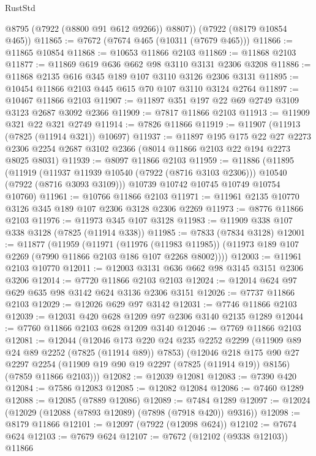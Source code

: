 \begin{lexlean}{RustStd}
\begin{coremodule}
        @8795
        (@7922 (@8800 @91 @612 @9266))
        @8807))
    (@7922 (@8179 @10854 @465))
@11865 := @7672 (@7674 @465 (@10311 (@7679 @465)))
@11866 := @11865 @10854
@11868 := @10653 @11866 @2103
@11869 := @11868 @2103
@11877 := @11869 @619 @636 @662 @98 @3110 @3131 @2306 @3208
@11886 := @11868 @2135 @616 @345 @189 @107 @3110 @3126 @2306 @3131
@11895 := @10454 @11866 @2103 @445 @615 @70 @107 @3110 @3124 @2764
@11897 := @10467 @11866 @2103
@11907 := @11897 @351 @197 @22 @69 @2749 @3109 @3123 @2687 @3092 @2366
@11909 := @7817 @11866 @2103
@11913 := @11909 @321 @22 @321 @2749
@11914 := @7826 @11866
@11919 := @11907 (@11913 (@7825 (@11914 @321)) @10697)
@11937 := @11897
    @195
    @175
    @22
    @27
    @2273
    @2306
    @2254
    @2687
    @3102
    @2366
    (@8014 @11866 @2103 @22 @194 @2273 @8025 @8031)
@11939 := @8097 @11866 @2103
@11959 := @11886
    (@11895
      (@11919 (@11937 @11939 @10540 (@7922 (@8716 @3103 @2306))) @10540 (@7922 (@8716 @3093 @3109)))
      @10739
      @10742
      @10745
      @10749
      @10754
      @10760)
@11961 := @10766 @11866 @2103
@11971 := @11961 @2135 @10770 @3126 @345 @189 @107 @2306 @3128 @2306 @2269
@11973 := @8776 @11866 @2103
@11976 := @11973 @345 @107 @3128
@11983 := @11909 @338 @107 @338 @3128 (@7825 (@11914 @338))
@11985 := @7833 (@7834 @3128)
@12001 := @11877
    (@11959
      (@11971
        (@11976 (@11983 @11985))
        (@11973 @189 @107 @2269 (@7990 @11866 @2103 @186 @107 @2268 @8002))))
@12003 := @11961 @2103 @10770
@12011 := @12003 @3131 @636 @662 @98 @3145 @3151 @2306 @3206
@12014 := @7720 @11866 @2103 @2103
@12024 := @12014 @624 @97 @629 @635 @98 @3142 @624 @3136 @2306 @3151
@12026 := @7737 @11866 @2103
@12029 := @12026 @629 @97 @3142
@12031 := @7746 @11866 @2103
@12039 := @12031 @420 @628 @1209 @97 @2306 @3140 @2135 @1289
@12044 := @7760 @11866 @2103 @628 @1209 @3140
@12046 := @7769 @11866 @2103
@12081 := @12044
    (@12046
      @173
      @220
      @24
      @235
      @2252
      @2299
      (@11909 @89 @24 @89 @2252 (@7825 (@11914 @89)) @7853)
      (@12046
        @218
        @175
        @90
        @27
        @2297
        @2254
        (@11909 @19 @90 @19 @2297 (@7825 (@11914 @19)) @8156)
        (@7859 @11866 @2103)))
@12082 := @12039 @12081
@12083 := @7390 @420
@12084 := @7586 @12083
@12085 := @12082 @12084
@12086 := @7460 @1289
@12088 := @12085 (@7889 @12086)
@12089 := @7484 @1289
@12097 := @12024 (@12029 (@12088 (@7893 @12089) (@7898 (@7918 @420)) @9316))
@12098 := @8179 @11866
@12101 := @12097 (@7922 (@12098 @624))
@12102 := @7674 @624
@12103 := @7679 @624
@12107 := @7672 (@12102 (@9338 @12103)) @11866

\end{coremodule}
\end{lexlean}
